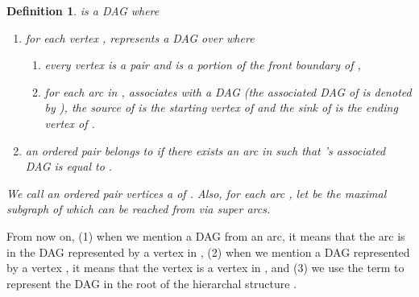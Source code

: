 \documentclass[11pt]{article}
\newtheorem{definition}[figure]{Definition}
\begin{document}
\begin{definition}
 is a DAG where

\begin{enumerate}

\item for each vertex ,  represents a DAG
 over  where
\begin{enumerate}
\item every vertex 
is a pair  and  is a portion
of the front boundary  of ,

\item for each arc  in ,  associates with a DAG 
(the associated DAG of  is denoted by ),
the source of  is the starting vertex  of  and
the sink of  is the ending vertex  of .
\end{enumerate}

\item an ordered pair  belongs to  if there exists an arc  in  such that
's associated DAG  is equal to .
\end{enumerate}
We call an ordered pair vertices  a  of .
Also, for each arc ,
let  be the maximal subgraph of  which
can be reached from  via super arcs.
\end{definition}






From now on,
(1) when we mention a DAG  from an arc, it means that
the arc  is in the DAG represented by a vertex in ,
(2) when we mention a DAG  represented by a vertex ,
it means that the vertex  is a vertex in , and
(3) we use the term  to represent the DAG
in the root of the hierarchal structure .
\end{document}
